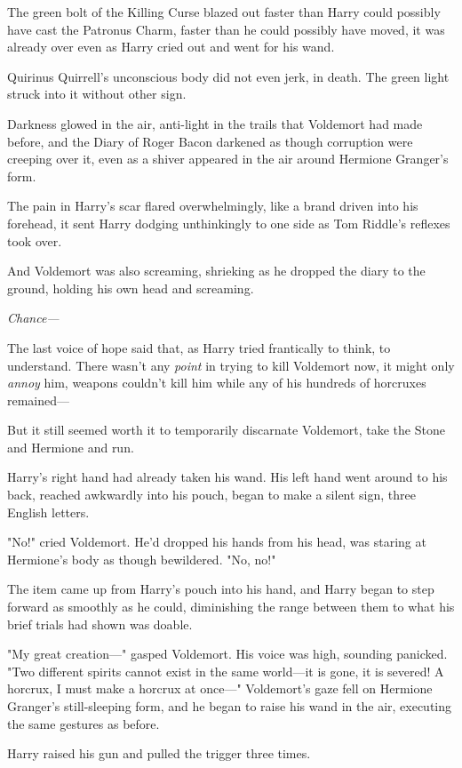 The green bolt of the Killing Curse blazed out faster than Harry could possibly
have cast the Patronus Charm, faster than he could possibly have moved, it was
already over even as Harry cried out and went for his wand.

Quirinus Quirrell's unconscious body did not even jerk, in death. The green
light struck into it without other sign.

Darkness glowed in the air, anti-light in the trails that Voldemort had made
before, and the Diary of Roger Bacon darkened as though corruption were
creeping over it, even as a shiver appeared in the air around Hermione
Granger's form.

The pain in Harry's scar flared overwhelmingly, like a brand driven into his
forehead, it sent Harry dodging unthinkingly to one side as Tom Riddle's
reflexes took over.

And Voldemort was also screaming, shrieking as he dropped the diary to the
ground, holding his own head and screaming.

\emph{Chance---}

The last voice of hope said that, as Harry tried frantically to think, to
understand. There wasn't any \emph{point} in trying to kill Voldemort now, it
might only \emph{annoy} him, weapons couldn't kill him while any of his
hundreds of horcruxes remained---

But it still seemed worth it to temporarily discarnate Voldemort, take the
Stone and Hermione and run.

Harry's right hand had already taken his wand. His left hand went around to his
back, reached awkwardly into his pouch, began to make a silent sign, three
English letters.

"No!" cried Voldemort. He'd dropped his hands from his head, was staring at
Hermione's body as though bewildered. "No, no!"

The item came up from Harry's pouch into his hand, and Harry began to step
forward as smoothly as he could, diminishing the range between them to what his
brief trials had shown was doable.

"My great creation---" gasped Voldemort. His voice was high, sounding panicked.
"Two different spirits cannot exist in the same world---it is gone, it is
severed! A horcrux, I must make a horcrux at once---" Voldemort's gaze fell on
Hermione Granger's still-sleeping form, and he began to raise his wand in the
air, executing the same gestures as before.

Harry raised his gun and pulled the trigger three times.
